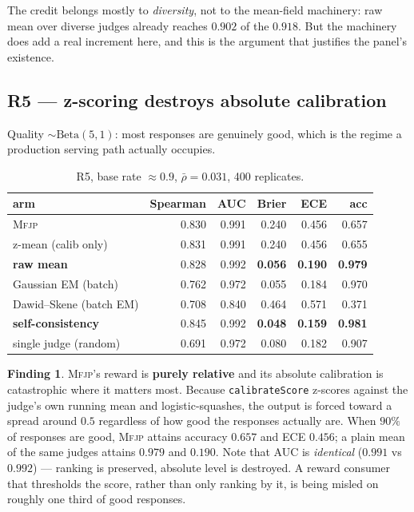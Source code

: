 \documentclass[11pt]{article}
\theoremstyle{definition}
\newtheorem{finding}{Finding}
\newcommand{\rhobar}{\ensuremath{\bar{\rho}}}
\newcommand{\mfjp}{\textsc{Mfjp}}
\begin{document}
The credit belongs mostly to \emph{diversity}, not to the mean-field machinery: raw mean over
diverse judges already reaches $0.902$ of the $0.918$. But the machinery does add a real
increment here, and this is the argument that justifies the panel's existence.

\subsection{R5 --- z-scoring destroys absolute calibration}
\label{sec:abs}

Quality $\sim\mathrm{Beta}(5,1)$: most responses are genuinely good, which is the regime a
production serving path actually occupies.

\begin{table}[H]\centering
\begin{tabular}{lrrrrr}
\toprule
arm & Spearman & AUC & Brier & ECE & acc \\
\midrule
\mfjp{}                       & 0.830 & 0.991 & 0.240 & 0.456 & 0.657 \\
z-mean (calib only)           & 0.831 & 0.991 & 0.240 & 0.456 & 0.655 \\
\textbf{raw mean}             & 0.828 & 0.992 & \textbf{0.056} & \textbf{0.190} & \textbf{0.979} \\
Gaussian EM (batch)           & 0.762 & 0.972 & 0.055 & 0.184 & 0.970 \\
Dawid--Skene (batch EM)       & 0.708 & 0.840 & 0.464 & 0.571 & 0.371 \\
\textbf{self-consistency}     & 0.845 & 0.992 & \textbf{0.048} & \textbf{0.159} & \textbf{0.981} \\
single judge (random)         & 0.691 & 0.972 & 0.080 & 0.182 & 0.907 \\
\bottomrule
\end{tabular}
\caption{R5, base rate $\approx 0.9$, $\rhobar=0.031$, 400 replicates.}
\end{table}

\begin{finding}
\mfjp{}'s reward is \textbf{purely relative} and its absolute calibration is catastrophic
where it matters most. Because \texttt{calibrateScore} z-scores against the judge's own running
mean and logistic-squashes, the output is forced toward a spread around $0.5$ regardless of how
good the responses actually are. When $90\%$ of responses are good, \mfjp{} attains accuracy
$0.657$ and ECE $0.456$; a plain mean of the same judges attains $0.979$ and $0.190$. Note
that AUC is \emph{identical} ($0.991$ vs $0.992$) --- ranking is preserved, absolute level is
destroyed. A reward consumer that thresholds the score, rather than only ranking by it, is
being misled on roughly one third of good responses.
\end{finding}
\end{document}
